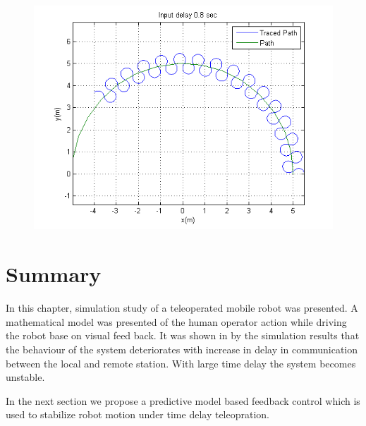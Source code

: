 \begin{figure}
	\includegraphics[width=\linewidth,keepaspectratio]{Chapter6/fig/Delay800milsec}
	\label{fig:delay800plot} 
\end{figure} 




 



\section{Summary}
In this chapter, simulation study of a teleoperated mobile robot was presented. A mathematical model was presented of the  human operator action while driving the robot base on visual feed back. It was shown in by the simulation results that the behaviour of the system deteriorates with increase in delay in communication between the local and remote station. With large time delay the system becomes unstable.

 In the next section we propose a predictive model based feedback control which is used to stabilize robot motion  under time delay teleopration.